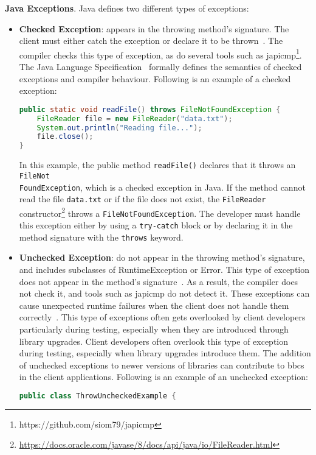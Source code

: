 \textbf{Java Exceptions}. Java defines two different types of exceptions:
\begin{itemize}
    \item \textbf{Checked Exception}: appears in the throwing method's signature. The client must either catch the exception or declare it to be
    thrown~\cite{Sousa2020evolution}. The compiler checks this type of exception, as do several tools
    such as japicmp\footnote{https://github.com/siom79/japicmp}. The Java Language Specification~\cite{Gosling2021java}
    formally defines the semantics of checked exceptions and compiler behaviour. Following is an example
    of a checked exception:
    \begin{lstlisting}[language=java]
public static void readFile() throws FileNotFoundException {
    FileReader file = new FileReader("data.txt");
    System.out.println("Reading file...");
    file.close();
}
    \end{lstlisting}
    In this example, the public method \texttt{readFile()} declares that it throws an \texttt{FileNot\\FoundException},
    which is a checked exception in Java. If the method cannot read the file \texttt{data.txt}
    or if the file does not exist, the \texttt{FileReader} constructor\footnote{\url{https://docs.oracle.com/javase/8/docs/api/java/io/FileReader.html}} throws a \texttt{FileNotFoundException}.
    The developer must handle this exception either by using a \texttt{try-catch} block or by declaring
    it in the method signature with the \texttt{throws} keyword.

    \item \textbf{Unchecked Exception}: do not appear in the throwing method's
    signature, and includes subclasses of RuntimeException or Error. This type
    of exception does not appear in the method's signature~\cite{Asaduzzaman2017}. As a result, the
    compiler does not check it, and tools such as japicmp do not detect it. These exceptions
    can cause unexpected runtime failures when the client does not handle them correctly~\cite{Padua2017}.
    This type of exceptions often gets overlooked by client developers particularly during testing,
    especially when they are introduced through library upgrades. Client developers often overlook
    this type of exception during testing, especially when library upgrades introduce them. The
    addition of unchecked exceptions to newer versions of libraries can contribute to \gls{bbc}s in
    the client applications. Following is an example of an unchecked exception:
    \begin{lstlisting}[language=java]
public class ThrowUncheckedExample {


\end{lstlisting}
\end{itemize}
